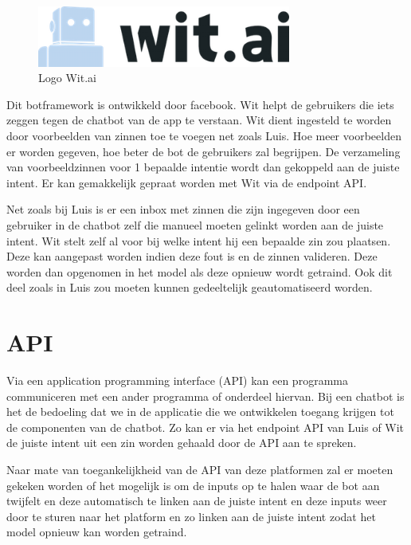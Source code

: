 \begin{figure}[h!]
	\centering
	\includegraphics[height=2cm]{wit.png}
	\caption{Logo Wit.ai ~\autocite{Eva2016}}
	\label{fig:wit}
\end{figure}

Dit botframework is ontwikkeld door facebook. Wit helpt de gebruikers die iets zeggen tegen de chatbot van de app te verstaan. Wit dient ingesteld te worden door voorbeelden van zinnen toe te voegen net zoals Luis. Hoe meer voorbeelden er worden gegeven, hoe beter de bot de gebruikers zal begrijpen. De verzameling van voorbeeldzinnen voor 1 bepaalde intentie wordt dan gekoppeld aan de juiste intent. Er kan gemakkelijk gepraat worden met Wit via de endpoint API. 

Net zoals bij Luis is er een inbox met zinnen die zijn ingegeven door een gebruiker in de chatbot zelf die manueel moeten gelinkt worden aan de juiste intent. Wit stelt zelf al voor bij welke intent hij een bepaalde zin zou plaatsen. Deze kan aangepast worden indien deze fout is en de zinnen valideren. Deze worden dan opgenomen in het model als deze opnieuw wordt getraind. Ook dit deel zoals in Luis zou moeten kunnen gedeeltelijk geautomatiseerd worden. ~\autocite{Wit2019}

\section{API}
\label{sec:API}

Via een application programming interface (API) kan een programma communiceren met een ander programma of onderdeel hiervan. Bij een chatbot is het de bedoeling dat we in de applicatie die we ontwikkelen toegang krijgen tot de componenten van de chatbot. Zo kan er via het endpoint API van Luis of Wit de juiste intent uit een zin worden gehaald door de API aan te spreken. 

Naar mate van toegankelijkheid van de API van deze platformen zal er moeten gekeken worden of het mogelijk is om de inputs op te halen waar de bot aan twijfelt en deze automatisch te linken aan de juiste intent en deze inputs weer door te sturen naar het platform en zo linken aan de juiste intent zodat het model opnieuw kan worden getraind. ~\autocite{Kristian2011}     




